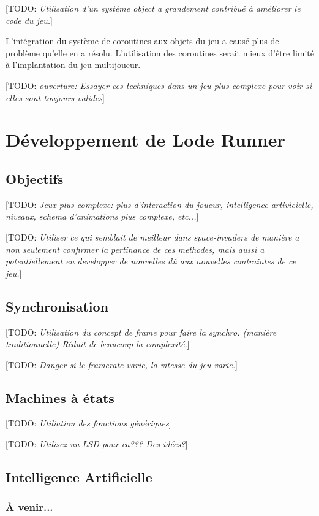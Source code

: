 \documentclass[12pt,oneside,letterpaper,francais]{book}
\newcommand{\todo}[1]{[TODO: {\it #1}]}
\begin{document}
\todo{Utilisation d'un système object a grandement contribué à
  améliorer le code du jeu.}

L'intégration du système de coroutines aux objets du jeu a causé plus
de problème qu'elle en a résolu. L'utilisation des coroutines serait
mieux d'être limité à l'implantation du jeu multijoueur.

\todo{ouverture: Essayer ces techniques dans un jeu plus complexe pour
  voir si elles sont toujours valides}


\section{Développement de \og Lode Runner \fg}
\subsection{Objectifs}
\todo{Jeux plus complexe: plus d'interaction du joueur, intelligence
  artivicielle, niveaux, schema d'animations plus complexe, etc...}

\todo{Utiliser ce qui semblait de meilleur dans space-invaders de
  manière a non seulement confirmer la pertinance de ces methodes,
  mais aussi a potentiellement en developper de nouvelles dû aux
  nouvelles contraintes de ce jeu.}

\subsection{Synchronisation}
\todo{Utilisation du concept de frame pour faire la synchro. (manière
  traditionnelle) Réduit de beaucoup la complexité.}

\todo{Danger si le framerate varie, la vitesse du jeu varie.}

\subsection{Machines à états}
\todo{Utiliation des fonctions génériques}

\todo{Utilisez un LSD pour ca??? Des idées?}

\subsection{Intelligence Artificielle}
\subsubsection{À venir...}
\end{document}
